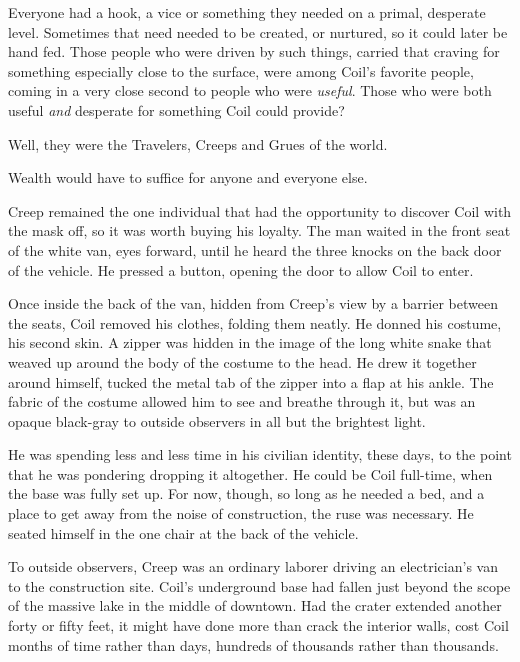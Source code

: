 Everyone had a hook, a vice or something they needed on a primal, desperate level.  Sometimes that need needed to be created, or nurtured, so it could later be hand fed.  Those people who were driven by such things, carried that craving for something especially close to the surface, were among Coil's favorite people, coming in a very close second to people who were \emph{useful}.  Those who were both useful \emph{and} desperate for something Coil could provide?



Well, they were the Travelers, Creeps and Grues of the world.



Wealth would have to suffice for anyone and everyone else.



Creep remained the one individual that had the opportunity to discover Coil with the mask off, so it was worth buying his loyalty.  The man waited in the front seat of the white van, eyes forward, until he heard the three knocks on the back door of the vehicle.  He pressed a button, opening the door to allow Coil to enter.



Once inside the back of the van, hidden from Creep's view by a barrier between the seats, Coil removed his clothes, folding them neatly.  He donned his costume, his second skin.  A zipper was hidden in the image of the long white snake that weaved up around the body of the costume to the head.  He drew it together around himself, tucked the metal tab of the zipper into a flap at his ankle. The fabric of the costume allowed him to see and breathe through it, but was an opaque black-gray to outside observers in all but the brightest light.



He was spending less and less time in his civilian identity, these days, to the point that he was pondering dropping it altogether.  He could be Coil full-time, when the base was fully set up.  For now, though, so long as he needed a bed, and a place to get away from the noise of construction, the ruse was necessary.  He seated himself in the one chair at the back of the vehicle.



To outside observers, Creep was an ordinary laborer driving an electrician's van to the construction site.  Coil's underground base had fallen just beyond the scope of the massive lake in the middle of downtown.  Had the crater extended another forty or fifty feet, it might have done more than crack the interior walls, cost Coil months of time rather than days, hundreds of thousands rather than thousands.



